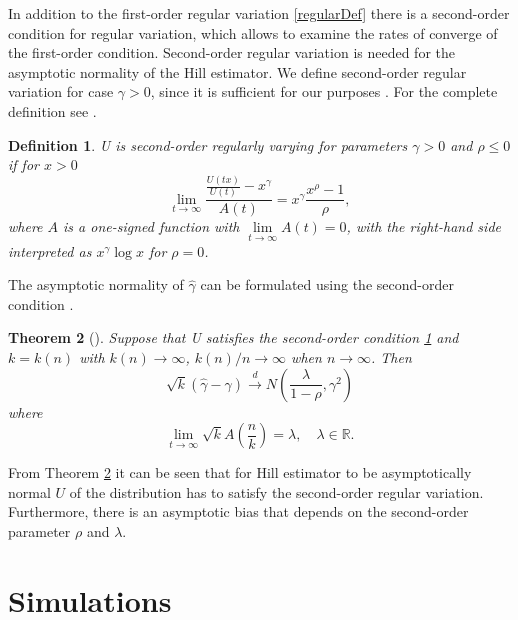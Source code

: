 \documentclass[english,12pt,a4paper,pdftex,sci,utf8]{aaltothesis} %
\newtheorem{theorem}{Theorem}[section]
\newtheorem{definition}[theorem]{Definition}
\begin{document}
In addition to the first-order regular variation \ref{regularDef} there is a second-order condition for regular variation, which allows to examine the rates of converge of the first-order condition. Second-order regular variation is needed for the asymptotic normality of the Hill estimator. We define second-order regular variation for case $\gamma > 0$, since it is sufficient for our purposes \cite{deHaan}. For the complete definition see \cite{geluk}.

\begin{definition}
U is second-order regularly varying for parameters $\gamma>0$ and $\rho \leq 0$ if for $x>0$
\begin{equation*}
\lim_{t \rightarrow \infty} \frac{\frac{U(tx)}{U(t)}-x^{\gamma}}{A(t)} = x^{\gamma} \frac{x^{\rho}-1}{\rho},
\end{equation*}
where $A$ is a one-signed function with $\lim\limits_{t \rightarrow \infty} A(t)=0$, with the right-hand side interpreted as $x^\gamma \log x$ for $\rho = 0$.
\label{2RV}
\end{definition}


The asymptotic normality of $\hat{\gamma}$ can be formulated using the second-order condition \cite{peng}.

\begin{theorem}[{\cite[Theorem 3.2.5]{deHaan}}]
Suppose that U satisfies the second-order condition \ref{2RV} and $k=k(n)$ with $k(n)\rightarrow \infty$, $k(n)/n \rightarrow \infty$ when $n\rightarrow \infty$. Then
\begin{equation*}
\sqrt{k}(\hat{\gamma} - \gamma) \xrightarrow{d} N \left( \frac{\lambda}{1- \rho}, \gamma^2 \right)
\end{equation*}
where
\begin{equation*}
\lim_{t \rightarrow \infty} \sqrt{k}A \left(\frac{n}{k} \right) = \lambda, \quad \lambda \in \mathbb{R}.
\end{equation*}
\label{normality}
\end{theorem}
From Theorem \ref{normality} it can be seen that for Hill estimator to be asymptotically normal $U$ of the distribution has to satisfy the second-order regular variation. Furthermore, there is an asymptotic bias that depends on the second-order parameter $\rho$ and $\lambda$.



\clearpage
\section{Simulations}
\label{simut}
\end{document}

